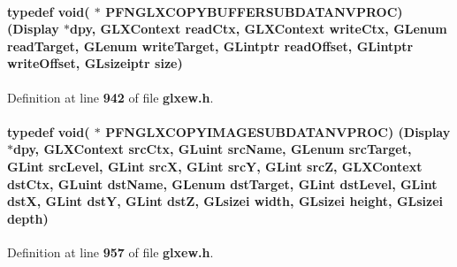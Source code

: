 \paragraph[{P\+F\+N\+G\+L\+X\+C\+O\+P\+Y\+B\+U\+F\+F\+E\+R\+S\+U\+B\+D\+A\+T\+A\+N\+V\+P\+R\+OC}]{\setlength{\rightskip}{0pt plus 5cm}typedef {\bf void}( $\ast$  P\+F\+N\+G\+L\+X\+C\+O\+P\+Y\+B\+U\+F\+F\+E\+R\+S\+U\+B\+D\+A\+T\+A\+N\+V\+P\+R\+OC) (Display $\ast$dpy, {\bf G\+L\+X\+Context} read\+Ctx, {\bf G\+L\+X\+Context} write\+Ctx, {\bf G\+Lenum} read\+Target, {\bf G\+Lenum} write\+Target, {\bf G\+Lintptr} read\+Offset, {\bf G\+Lintptr} write\+Offset, {\bf G\+Lsizeiptr} {\bf size})}\label{glxew_8h_ae1f2f650eeafcf011b6c29fcb29aec25}


Definition at line {\bf 942} of file {\bf glxew.\+h}.

\paragraph[{P\+F\+N\+G\+L\+X\+C\+O\+P\+Y\+I\+M\+A\+G\+E\+S\+U\+B\+D\+A\+T\+A\+N\+V\+P\+R\+OC}]{\setlength{\rightskip}{0pt plus 5cm}typedef {\bf void}( $\ast$  P\+F\+N\+G\+L\+X\+C\+O\+P\+Y\+I\+M\+A\+G\+E\+S\+U\+B\+D\+A\+T\+A\+N\+V\+P\+R\+OC) (Display $\ast$dpy, {\bf G\+L\+X\+Context} src\+Ctx, {\bf G\+Luint} {\bf src\+Name}, {\bf G\+Lenum} {\bf src\+Target}, {\bf G\+Lint} {\bf src\+Level}, {\bf G\+Lint} {\bf srcX}, {\bf G\+Lint} {\bf srcY}, {\bf G\+Lint} {\bf srcZ}, {\bf G\+L\+X\+Context} dst\+Ctx, {\bf G\+Luint} {\bf dst\+Name}, {\bf G\+Lenum} {\bf dst\+Target}, {\bf G\+Lint} {\bf dst\+Level}, {\bf G\+Lint} {\bf dstX}, {\bf G\+Lint} {\bf dstY}, {\bf G\+Lint} {\bf dstZ}, {\bf G\+Lsizei} {\bf width}, {\bf G\+Lsizei} {\bf height}, {\bf G\+Lsizei} {\bf depth})}\label{glxew_8h_a6b3a4bb777aa55a4fa1cae092eb778b9}


Definition at line {\bf 957} of file {\bf glxew.\+h}.

